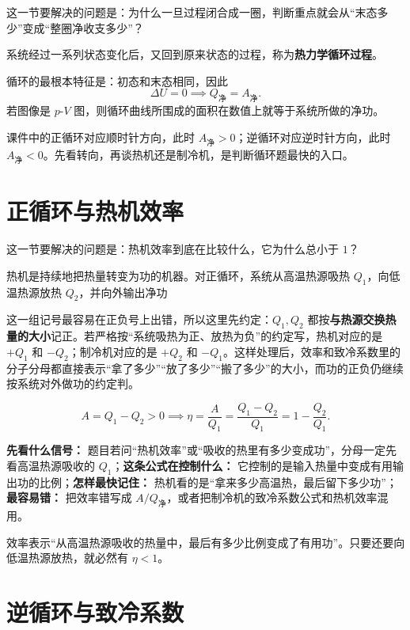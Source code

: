 \documentclass[lang=cn,11pt]{elegantbook}
\newcommand{\bridge}[1]{\begin{note}#1\end{note}}
\begin{document}
这一节要解决的问题是：为什么一旦过程闭合成一圈，判断重点就会从“末态多少”变成“整圈净收支多少”？

\begin{definition}[热力学循环过程]
系统经过一系列状态变化后，又回到原来状态的过程，称为\textbf{热力学循环过程}。
\end{definition}

循环的最根本特征是：初态和末态相同，因此
\[
\Delta U=0 \implies Q_{\text{净}}=A_{\text{净}}.
\]
若图像是 \(p\)-\(V\) 图，则循环曲线所围成的面积在数值上就等于系统所做的净功。

\begin{note}
课件中的正循环对应顺时针方向，此时 \(A_{\text{净}}>0\)；逆循环对应逆时针方向，此时 \(A_{\text{净}}<0\)。先看转向，再谈热机还是制冷机，是判断循环题最快的入口。
\end{note}

\section{正循环与热机效率}

这一节要解决的问题是：热机效率到底在比较什么，它为什么总小于 \(1\)？

热机是持续地把热量转变为功的机器。对正循环，系统从高温热源吸热 \(Q_1\)，向低温热源放热 \(Q_2\)，并向外输出净功
\bridge{这一组记号最容易在正负号上出错，所以这里先约定：\(Q_1,Q_2\) 都按\textbf{与热源交换热量的大小}记正。若严格按“系统吸热为正、放热为负”的约定写，热机对应的是 \(+Q_1\) 和 \(-Q_2\)；制冷机对应的是 \(+Q_2\) 和 \(-Q_1\)。这样处理后，效率和致冷系数里的分子分母都直接表示“拿了多少”“放了多少”“搬了多少”的大小，而功的正负仍继续按系统对外做功的约定判。}
\[
A=Q_1-Q_2>0
\implies \eta=\frac{A}{Q_1}=\frac{Q_1-Q_2}{Q_1}=1-\frac{Q_2}{Q_1}.
\]

\begin{note}
\textbf{先看什么信号：} 题目若问“热机效率”或“吸收的热里有多少变成功”，分母一定先看高温热源吸收的 \(Q_1\)；\textbf{这条公式在控制什么：} 它控制的是输入热量中变成有用输出功的比例；\textbf{怎样最快记住：} 热机看的是“拿来多少高温热，最后留下多少功”；\textbf{最容易错：} 把效率错写成 \(A/Q_{\text{净}}\)，或者把制冷机的致冷系数公式和热机效率混用。
\end{note}

效率表示“从高温热源吸收的热量中，最后有多少比例变成了有用功”。只要还要向低温热源放热，就必然有 \(\eta<1\)。

\section{逆循环与致冷系数}
\end{document}

